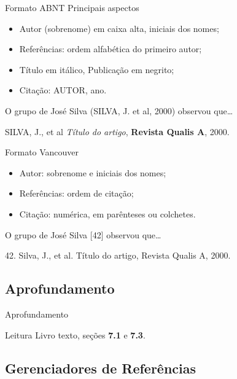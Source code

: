 \documentclass{beamer}
\begin{document}
\begin{frame}{Formato ABNT}
  Principais aspectos
  \begin{itemize}
  \item Autor (sobrenome) em caixa alta, iniciais dos nomes;
  \item Referências: ordem alfabética do primeiro autor;
  \item Título em itálico, Publicação em negrito;
  \item Citação: AUTOR, ano.
  \end{itemize}
  \begin{example}[Citação]
    O grupo de José Silva (SILVA, J. et al, 2000) observou que\ldots
  \end{example}
  \begin{example}[Referência]
    SILVA, J., et al {\em Título do artigo}, {\bf Revista Qualis A},
    2000.
  \end{example}
\end{frame}

\begin{frame}{Formato Vancouver}
  \begin{itemize}
  \item Autor: sobrenome e iniciais dos nomes;
  \item Referências: ordem de citação;
  \item Citação: numérica, em parênteses ou colchetes.
  \end{itemize}
  \begin{example}[Citação]
    O grupo de José Silva [42] observou que\ldots
  \end{example}
  \begin{example}[Referência]
    42. Silva, J., et al. Título do artigo, Revista Qualis A, 2000.
  \end{example}
\end{frame}

\subsection{Aprofundamento}

\begin{frame}{Aprofundamento}
  \begin{block}{Leitura}
    Livro texto, seções {\bf 7.1} e {\bf 7.3}.
  \end{block}
\end{frame}

\subsection{Gerenciadores de Referências}
\end{document}
